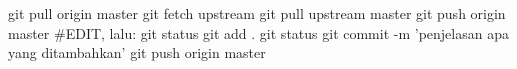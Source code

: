 git pull origin master
git fetch upstream
git pull upstream master
git push origin master
#EDIT, lalu:
git status
git add .
git status
git commit -m 'penjelasan apa yang ditambahkan'
git push origin master